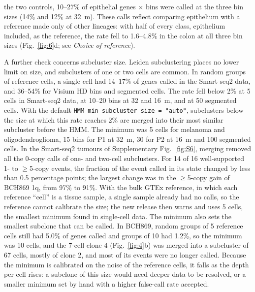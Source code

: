 the two controls, 10--27\% of epithelial genes $\times$ bins were called at the three bin sizes (14\% and 12\% at 32~\textmu m). These calls reflect comparing epithelium with a reference made only of other lineages: with half of every class, epithelium included, as the reference, the rate fell to 1.6--4.8\% in the colon at all three bin sizes (Fig.~\ref{fig:6}d; see \emph{Choice of reference}).

A further check concerns subcluster size. Leiden subclustering places no lower limit on size, and subclusters of one or two cells are common. In random groups of reference cells, a single cell had 14--17\% of genes called in the Smart-seq2 data, and 36--54\% for Visium HD bins and segmented cells. The rate fell below 2\% at 5 cells in Smart-seq2 data, at 10--20 bins at 32 and 16~\textmu m, and at 50 segmented cells. With the default \texttt{HMM\_min\_subcluster\_size\ =\ "auto"}, subclusters below the size at which this rate reaches 2\% are merged into their most similar subcluster before the HMM. The minimum was 5 cells for melanoma and oligodendroglioma, 15 bins for P1 at 32~\textmu m, 30 for P2 at 16~\textmu m and 100 segmented cells. In the Smart-seq2 tumours of Supplementary Fig.~\ref{fig:S6}, merging removed all the 0-copy calls of one- and two-cell subclusters. For 14 of 16 well-supported 1- to $\geq$5-copy events, the fraction of the event called in its state changed by less than 0.5 percentage points; the largest change was in the $\geq$5-copy gain of BCH869 1q, from 97\% to 91\%. With the bulk GTEx reference, in which each reference ``cell'' is a tissue sample, a single sample already had no calls, so the reference cannot calibrate the size; the new release then warns and uses 5 cells, the smallest minimum found in single-cell data. The minimum also sets the smallest subclone that can be called. In BCH869, random groups of 5 reference cells still had 5.0\% of genes called and groups of 10 had 1.2\%, so the minimum was 10 cells, and the 7-cell clone 4 (Fig.~\ref{fig:4}b) was merged into a subcluster of 67 cells, mostly of clone 2, and most of its events were no longer called. Because the minimum is calibrated on the noise of the reference cells, it falls as the depth per cell rises: a subclone of this size would need deeper data to be resolved, or a smaller minimum set by hand with a higher false-call rate accepted.

